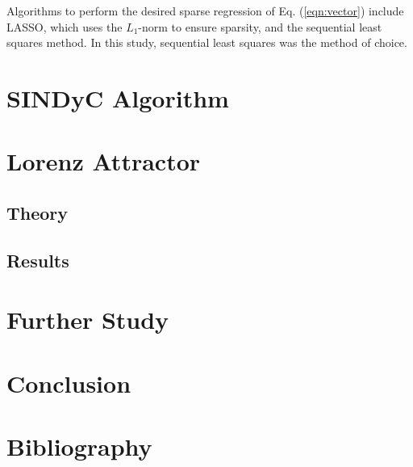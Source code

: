 \documentclass[12pt,preprintnumbers,amsmath,amssymb,titlepage]{report}
\newcommand{\refe}[1]{Eq. (\ref{#1})}
\begin{document}
Algorithms to perform the desired sparse regression of \refe{eqn:vector} include LASSO, which uses the $L_1$-norm to ensure sparsity, and the sequential least squares method. In this study, sequential least squares was the method of choice.




\section*{SINDyC Algorithm}



\section*{Lorenz Attractor}

\subsection*{Theory}

\subsection*{Results}



\section{Further Study}

\section*{Conclusion}

\section*{Bibliography}


\end{document}

